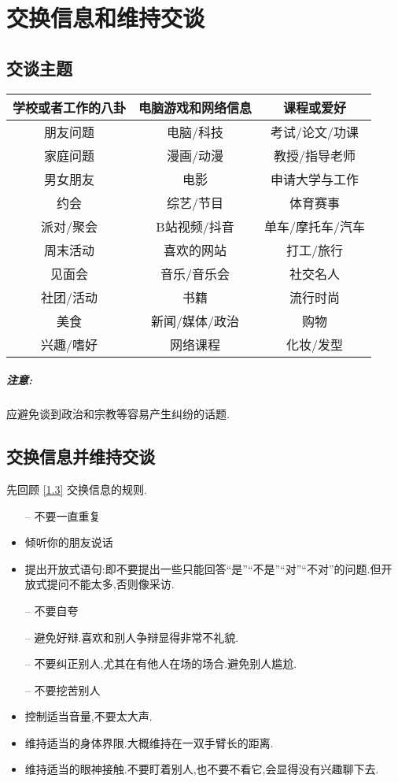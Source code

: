 \documentclass[UTF8]{article}
\newcommand{\indList}{\vspace{-6pt}}
\newcommand{\warn}{\subparagraph*{注意:}}
\newcommand{\dash}{–}
\begin{document}
\newpage
\section{交换信息和维持交谈}

\subsection{交谈主题}
\indList
\begin{center}
\begin{tabular}{c|c|c}
    \textbf{学校或者工作的八卦}& \textbf{电脑游戏和网络信息} &\textbf{课程或爱好}\\\hline 
    朋友问题& 电脑/科技& 考试/论文/功课\\ 
    家庭问题& 漫画/动漫& 教授/指导老师\\ 
    男女朋友& 电影& 申请大学与工作\\ 
    约会& 综艺/节目& 体育赛事\\ 
    派对/聚会& B站视频/抖音& 单车/摩托车/汽车\\ 
    周末活动& 喜欢的网站& 打工/旅行\\ 
    见面会& 音乐/音乐会& 社交名人\\ 
    社团/活动& 书籍& 流行时尚\\ 
    美食& 新闻/媒体/政治& 购物\\ 
    兴趣/嗜好& 网络课程& 化妆/发型\\
\end{tabular}
\end{center}
\indList\indList
\warn 应避免谈到政治和宗教等容易产生纠纷的话题.

\subsection{交换信息并维持交谈}
先回顾 \ref{1.3} 交换信息的规则.
\begin{itemize}
    \item[\dash] 不要一直重复
    \item 倾听你的朋友说话
    \item 提出开放式语句:即不要提出一些只能回答``是''``不是''``对''``不对''的问题.但开放式提问不能太多,否则像采访.
    \item[\dash] 不要自夸
    \item[\dash] 避免好辩.喜欢和别人争辩显得非常不礼貌.
    \item[\dash] 不要纠正别人,尤其在有他人在场的场合.避免别人尴尬.
    \item[\dash] 不要挖苦别人
    \item 控制适当音量,不要太大声.
    \item 维持适当的身体界限.大概维持在一双手臂长的距离.
    \item 维持适当的眼神接触.不要盯着别人,也不要不看它,会显得没有兴趣聊下去.
\end{itemize}
\end{document}
